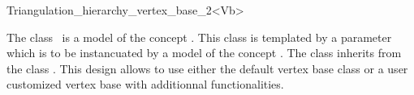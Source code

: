 

\begin{ccRefClass}{Triangulation_hierarchy_vertex_base_2<Vb>}  %


\ccDefinition
  
The class \ccRefName\ is a model of the concept
.
This class is templated by a parameter 
which is to be instancuated by a model of  the concept
.
The class  inherits
from the class .
This design allows to use either the default
vertex base class or a user customized
vertex base with additionnal functionalities.


\ccIsModel
{}

\ccInheritsFrom
{}

\ccTypes
{}

\ccSeeAlso
{} \\
 \\




\end{ccRefClass}



